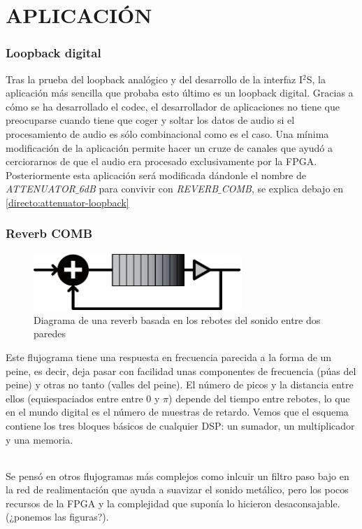 \part{APLICACIÓN}

\section{Loopback digital}
	Tras la prueba del loopback analógico y del desarrollo de la interfaz I$^2$S, la  aplicación más sencilla que probaba esto último es un loopback digital. Gracias a cómo se ha desarrollado el codec, el desarrollador de aplicaciones no tiene que preocuparse cuando tiene que coger y soltar los datos de audio si el procesamiento de audio es sólo combinacional como es el caso.
	Una mínima modificación de la aplicación permite hacer un cruze de canales que ayudó a cerciorarnos de que el audio era procesado exclusivamente por la FPGA. Posteriormente esta aplicación será modificada dándonle el nombre de \emph{ATTENUATOR$\_$6dB} para convivir con \emph{REVERB$\_$COMB}, se explica debajo en \ref{directo:attenuator-loopback}

\section{Reverb COMB}
\begin{figure}[h]
\begin{center}
	\includegraphics[width=0.7\textwidth]{./reverb_simple_diagram-eps-converted-to}
\caption{Diagrama de una reverb basada en los rebotes del sonido entre dos paredes}
\end{center}
\end{figure}
	Este flujograma tiene una respuesta en frecuencia parecida a la forma de un peine, es decir, deja pasar con facilidad unas componentes de frecuencia (púas del peine) y otras no tanto (valles del peine). El número de picos y la distancia entre ellos (equiespaciados entre entre 0 y $\pi$) depende del tiempo entre rebotes, lo que en el mundo digital es el número de muestras de retardo. Vemos que el esquema contiene los tres bloques básicos de cualquier DSP: un sumador, un multiplicador y una memoria.
	
\paragraph{} Se pensó en otros flujogramas más complejos como inlcuir un filtro paso bajo en la red de realimentación que ayuda a suavizar el sonido metálico, pero los pocos recursos de la FPGA y la complejidad que suponía lo hicieron desaconsajable. \textcolor{rosa}{(¿ponemos las figuras?)}.
